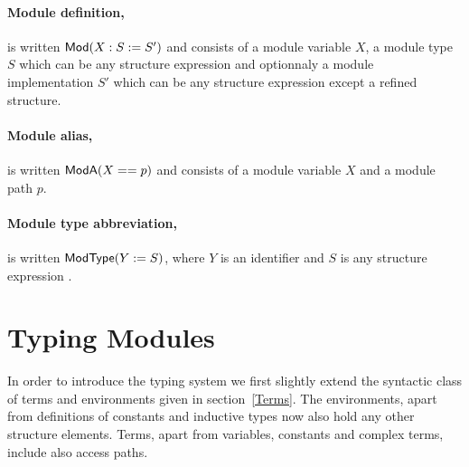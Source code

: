 \paragraph{Module definition,} is written ${\sf Mod}({X}:{S}:={S'})$ and
 consists of a module variable $X$, a module type
$S$ which can be any structure expression and optionnaly a module implementation $S'$ 
 which can be any structure expression except a refined structure.

\paragraph{Module alias,} is written ${\sf ModA}({X}=={p})$ and
 consists of a module variable $X$ and a module path $p$. 

\paragraph{Module type abbreviation,} is written ${\sf ModType}({Y}:={S})$, where
$Y$ is an identifier and $S$ is any structure expression .


\section{Typing Modules}

In order to introduce the typing system we first slightly extend
the syntactic class of terms and environments given in
section~\ref{Terms}. The environments, apart from definitions of
constants and inductive types now also hold any other structure elements.
Terms, apart from variables, constants and complex terms, 
include also access paths.

